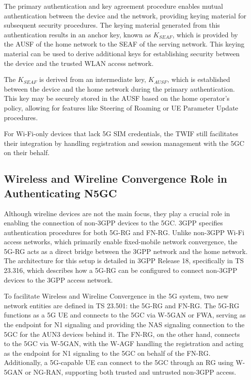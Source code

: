 The primary authentication and key agreement procedure enables mutual authentication between the device and the network, providing keying material for subsequent security procedures. The keying material generated from this authentication results in an anchor key, known as $K_{SEAF}$, which is provided by the \ac{AUSF} of the home network to the \ac{SEAF} of the serving network. This keying material can be used to derive additional keys for establishing security between the device and the trusted \ac{WLAN} access network.

The $K_{SEAF}$ is derived from an intermediate key, $K_{AUSF}$, which is established between the device and the home network during the primary authentication. This key may be securely stored in the \ac{AUSF} based on the home operator’s policy, allowing for features like Steering of Roaming or \ac{UE} Parameter Update procedures.

For Wi-Fi-only devices that lack \ac{5G} SIM credentials, the \ac{TWIF} still facilitates their integration by handling registration and session management with the \ac{5GC} on their behalf.

\subsection{Wireless and Wireline Convergence Role in Authenticating \ac{N5GC}}

Although wireline devices are not the main focus, they play a crucial role in enabling the connection of non-\ac{3GPP} devices to the \ac{5GC}. \ac{3GPP} specifies authentication procedures for both \ac{5G-RG} and \ac{FN-RG}. Unlike non-\ac{3GPP} Wi-Fi access networks, which primarily enable fixed-mobile network convergence, the \ac{5G-RG} acts as a direct bridge between the \ac{3GPP} network and the home network. The architecture for this setup is detailed in \ac{3GPP} Release 18, specifically in \ac{TS 23.316}, which describes how a \ac{5G-RG} can be configured to connect non-\ac{3GPP} devices to the \ac{3GPP} access network.~\cite{23.316}

To facilitate Wireless and Wireline Convergence in the \ac{5G} system, two new network entities are defined in \ac{TS 23.501}: the \ac{5G-RG} and \ac{FN-RG}. The \ac{5G-RG} functions as a \ac{5G} \ac{UE} and connects to the \ac{5GC} via \ac{W-5GAN} or \ac{FWA}, serving as the endpoint for \ac{N1} signaling and providing the \ac{NAS} signaling connection to the \ac{5GC} for the \ac{AUN3} devices behind it. The \ac{FN-RG}, on the other hand, connects to the \ac{5GC} via \ac{W-5GAN}, with the \ac{W-AGF} handling the registration and acting as the endpoint for \ac{N1} signaling to the \ac{5GC} on behalf of the \ac{FN-RG}. Additionally, a \ac{5G}-capable \ac{UE} can connect to the \ac{5GC} through an RG using \ac{W-5GAN} or \ac{NG-RAN}, supporting both trusted and untrusted non-\ac{3GPP} access.

